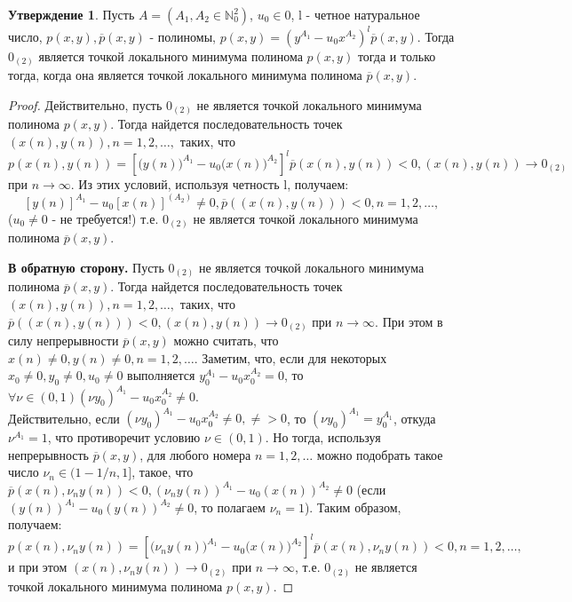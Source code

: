\documentclass[11pt,reqno]{amsart}
\theoremstyle{plain}
\theoremstyle{definition}
\newtheorem{statement}{Утверждение}
\begin{document}
\begin{statement}\label{nef:stt:10}
Пусть $A = (A_1, A_2 \in \mathbb{N}^2_0)$, $u_0 \in 0$, l - четное натуральное число, $p(x,y), \overline{p}(x,y)$ - полиномы, $p(x,y) = (y^{A_1} - u_0x^{A_2})^l\overline{p}(x,y)$. Тогда $0_{(2)}$ является точкой локального минимума полинома $p(x,y)$ тогда и только тогда, когда она является точкой локального минимума полинома $\overline{p}(x,y)$.
\end{statement}
\noindent \begin{proof}
Действительно, пусть $0_{(2)}$ не является точкой локального минимума полинома $p(x,y)$. Тогда найдется последовательность точек $(x(n),y(n)), n = 1,2,\dots,$ таких, что $p(x(n),y(n)) = {\left[\big(y(n) \big)^{A_1} - u_0\big(x(n) \big)^{A_2}\right]}^l\overline{p}(x(n),y(n)) < 0, (x(n),y(n)) \to 0_{(2)}$ при $n \to \infty$.
Из этих условий, используя четность l, получаем:
$$\left[ y(n)\right]^{A_1} - u_0\left[x(n)\right]^(A_2) \ne 0, \overline{p}((x(n),y(n))) < 0, n=1,2,\dots,$$
($u_0 \ne 0$ - не требуется!) т.е. $0_{(2)}$ не является точкой локального минимума полинома $\overline{p}(x,y)$.

\textbf{В обратную сторону.} Пусть $0_{(2)}$ не является точкой локального минимума полинома $\overline{p}(x,y)$. Тогда найдется последовательность точек $(x(n),y(n)), n=1,2,\dots,$ таких, что $\overline{p}((x(n),y(n))) < 0, (x(n), y(n)) \to 0_{(2)}$ при $n \to \infty$. При этом в силу непрерывности $\overline{p}(x,y)$ можно считать, что $x(n) \ne 0, y(n) \ne 0, n = 1,2,\dots$. Заметим, что, если для некоторых $x_0 \ne 0, y_0 \ne 0, u_0 \ne 0$ выполняется $y^{A_1}_0 - u_0x^{A_2}_0 = 0$, то $\forall \nu \in (0,1) (\nu y_0)^{A_1} - u_0x_0^{A_2} \ne 0$.\\
Действительно, если $(\nu y_0)^{A_1} - u_0x_0^{A_2} \ne 0, \ne > 0$, то $(\nu y_0)^{A_1} = y^{A_1}_0$, откуда $\nu^{A_1} = 1$, что противоречит условию $\nu \in (0,1)$. Но тогда, используя непрерывность $\overline{p}(x,y)$, для любого номера $n = 1,2,\dots$ можно подобрать такое число $\nu_n \in (1-1/n, 1]$, такое, что 
$\overline{p}(x(n),\nu_n y(n)) < 0, \left(\nu_n y(n)\right)^{A_1} - u_0(x(n))^{A_2} \ne 0$ (если $\left(y(n) \right)^{A_1} - u_0\left(y(n) \right)^{A_2} \ne 0$, то полагаем $\nu_n = 1$). Таким образом, получаем:
$$p(x(n),\nu_n y(n)) = \left[ \big( \nu_n y(n)\big)^{A_1} - u_0\big( x(n)\big)^{A_2} \right]^l \overline{p}(x(n),\nu_n y(n)) < 0, n = 1,2,\dots,$$
и при этом $(x(n),\nu_n y(n)) \to 0_{(2)}$ при $n \to \infty$, т.е. $0_{(2)}$ не является точкой локального
минимума полинома $p(x,y)$.
\end{proof}
\end{document}
